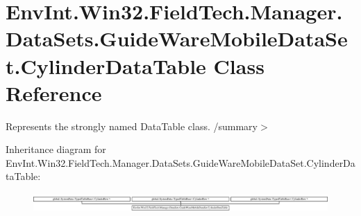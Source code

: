 \hypertarget{class_env_int_1_1_win32_1_1_field_tech_1_1_manager_1_1_data_sets_1_1_guide_ware_mobile_data_set_1_1_cylinder_data_table}{}\section{Env\+Int.\+Win32.\+Field\+Tech.\+Manager.\+Data\+Sets.\+Guide\+Ware\+Mobile\+Data\+Set.\+Cylinder\+Data\+Table Class Reference}
\label{class_env_int_1_1_win32_1_1_field_tech_1_1_manager_1_1_data_sets_1_1_guide_ware_mobile_data_set_1_1_cylinder_data_table}


Represents the strongly named Data\+Table class. /summary$>$  


Inheritance diagram for Env\+Int.\+Win32.\+Field\+Tech.\+Manager.\+Data\+Sets.\+Guide\+Ware\+Mobile\+Data\+Set.\+Cylinder\+Data\+Table\+:\begin{figure}[H]
\begin{center}
\leavevmode
\includegraphics[height=0.716571cm]{class_env_int_1_1_win32_1_1_field_tech_1_1_manager_1_1_data_sets_1_1_guide_ware_mobile_data_set_1_1_cylinder_data_table}
\end{center}
\end{figure}

